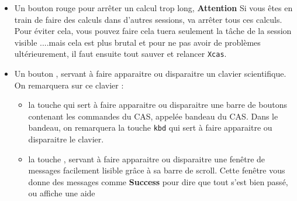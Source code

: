 \documentclass[a4paper,11pt]{article}
\begin{document}
\begin{enumerate}
\begin{itemize}
le CAS et sur lequel est marqu\'e la ligne d'\'etat rappelant cette 
configuration., dans l'exemple, on 
est en mode exact et r\'eel, les angles sont exprim\'es 
en radian, les calculs num\'eriques sont faits avec 12 chiffres 
significatifs, le style de programmation est {\tt xcas} et enfin les 
resources en m\'emoire demand\'ees par le calcul sont de 12.65M (c'est la 
taille m\'emoire en M\'egabits utilis\'ee par {\tt Xcas}).\\
Sur cette ligne d'\'etat, le mode num\'erique sera not\'e {\tt approx} et le 
mode complexe sera not\'e :
\begin{itemize}
\item {\tt cplx} si les variables ne sont pas consid\'er\'ees comme complexes 
(on a alors {\tt re(z)=z} et {\tt conj(z)=z}), 
\item {\tt CPLX} si les variables sont consid\'er\'ees comme complexes 
(on a alors {\tt re(z)=re(z)} et {\tt im(z)=im(z)} qui seront not\'es
respectivement  $\mathfrak R(z)$ et $\mathfrak I(z)$ dans la r\'eponse).
\end{itemize}
Notez que ce bouton "ligne d'\'etat"  ouvre la fen\^etre de 
configuration qui est aussi obtenue \`a partir du menu :
{\tt Cfg$\blacktriangleright$Configuration du CAS},
\item  Un bouton rouge  pour arr\^eter un calcul trop long, 
{\bf Attention} Si vous \^etes en train de faire des calculs dans d'autres 
sessions,  va arr\^eter tous ces calculs. Pour \'eviter 
cela, vous pouvez faire   cela tuera seulement la 
t\^ache de la session visible ....mais cela est plus brutal et pour ne pas 
avoir de probl\`emes ult\'erieurement, il faut ensuite tout sauver et relancer 
{\tt Xcas}.
\item Un bouton , servant \`a faire apparaitre ou disparaitre
un clavier scientifique.
On remarquera sur ce clavier :
\begin{itemize}
\item la touche  qui sert \`a faire apparaitre
ou disparaitre une barre de boutons contenant les commandes du CAS, appel\'ee 
bandeau du CAS. Dans le bandeau, on remarquera la touche {\tt kbd} qui sert 
\`a faire apparaitre ou disparaitre le clavier.
\item la touche , servant \`a faire apparaitre
 ou disparaitre une fen\^etre de messages facilement lisible gr\^ace \`a sa 
barre de scroll. Cette fen\^etre vous donne des messages comme
{\bf Success} pour dire que tout s'est bien pass\'e, ou affiche une aide 

\end{itemize}
\end{itemize}
\end{enumerate}
\end{document}

